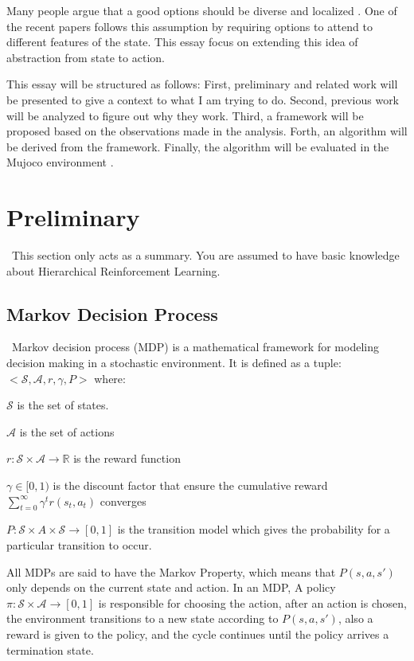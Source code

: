 \documentclass{article}
\begin{document}
	\quad Many people argue that a good options should be diverse and localized \cite{khetarpal2020options}. One of the recent papers \cite{attentionoptioncritic} follows this assumption by requiring options to attend to different features of the state. This essay focus on extending this idea of abstraction from state to action. 
	
	\quad This essay will be structured as follows: First, preliminary and related work will be presented to give a context to what I am trying to do. Second, previous work will be analyzed to figure out why they work. Third, a framework will be proposed based on the observations made in the analysis. Forth, an algorithm will be derived from the framework. Finally, the algorithm will be evaluated in the Mujoco environment \cite{mujoco}.
	\section{Preliminary}
	\qquad \ This section only acts as a summary. You are assumed to have basic knowledge about Hierarchical Reinforcement Learning.
	\subsection*{Markov Decision Process}
	\qquad \  Markov decision process (MDP) \cite{sutton2018reinforcement} is a mathematical framework for modeling decision making in a stochastic environment. It is defined as a tuple: $<\mathcal{S}, \mathcal{A}, r, \gamma, P>$ where:
	
	$\mathcal{S}$ is the set of states.
	
	$\mathcal{A}$ is the set of actions
	
	$r : \mathcal{S} \times \mathcal{A} \rightarrow \mathbb{R}$ is the reward function
	
	$\gamma \in [0,1)$ is the discount factor that ensure the cumulative reward $\sum_{t=0}^{\infty} \gamma^t r(s_t, a_t)$ converges
	
	$P : \mathcal{S} \times A \times \mathcal{S} \rightarrow [0,1]$ is the transition model which gives the probability for a particular transition to occur.
	
	\quad All MDPs are said to have the Markov Property, which means that $P(s,a,s')$ only depends on the current state and action. In an MDP, A policy $\pi : \mathcal{S} \times \mathcal{A} \rightarrow [0,1]$ is responsible for choosing the action, after an action is chosen, the environment transitions to a new state according to $P(s,a,s')$, also a reward is given to the policy, and the cycle continues until the policy arrives a termination state.
\end{document}
